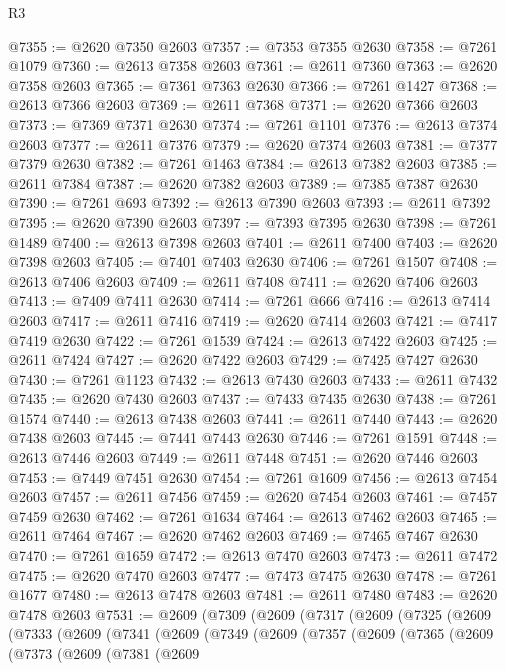 \begin{lexlean}{R3}
\begin{coremodule}
@7355 := @2620 @7350 @2603
@7357 := @7353 @7355 @2630
@7358 := @7261 @1079
@7360 := @2613 @7358 @2603
@7361 := @2611 @7360
@7363 := @2620 @7358 @2603
@7365 := @7361 @7363 @2630
@7366 := @7261 @1427
@7368 := @2613 @7366 @2603
@7369 := @2611 @7368
@7371 := @2620 @7366 @2603
@7373 := @7369 @7371 @2630
@7374 := @7261 @1101
@7376 := @2613 @7374 @2603
@7377 := @2611 @7376
@7379 := @2620 @7374 @2603
@7381 := @7377 @7379 @2630
@7382 := @7261 @1463
@7384 := @2613 @7382 @2603
@7385 := @2611 @7384
@7387 := @2620 @7382 @2603
@7389 := @7385 @7387 @2630
@7390 := @7261 @693
@7392 := @2613 @7390 @2603
@7393 := @2611 @7392
@7395 := @2620 @7390 @2603
@7397 := @7393 @7395 @2630
@7398 := @7261 @1489
@7400 := @2613 @7398 @2603
@7401 := @2611 @7400
@7403 := @2620 @7398 @2603
@7405 := @7401 @7403 @2630
@7406 := @7261 @1507
@7408 := @2613 @7406 @2603
@7409 := @2611 @7408
@7411 := @2620 @7406 @2603
@7413 := @7409 @7411 @2630
@7414 := @7261 @666
@7416 := @2613 @7414 @2603
@7417 := @2611 @7416
@7419 := @2620 @7414 @2603
@7421 := @7417 @7419 @2630
@7422 := @7261 @1539
@7424 := @2613 @7422 @2603
@7425 := @2611 @7424
@7427 := @2620 @7422 @2603
@7429 := @7425 @7427 @2630
@7430 := @7261 @1123
@7432 := @2613 @7430 @2603
@7433 := @2611 @7432
@7435 := @2620 @7430 @2603
@7437 := @7433 @7435 @2630
@7438 := @7261 @1574
@7440 := @2613 @7438 @2603
@7441 := @2611 @7440
@7443 := @2620 @7438 @2603
@7445 := @7441 @7443 @2630
@7446 := @7261 @1591
@7448 := @2613 @7446 @2603
@7449 := @2611 @7448
@7451 := @2620 @7446 @2603
@7453 := @7449 @7451 @2630
@7454 := @7261 @1609
@7456 := @2613 @7454 @2603
@7457 := @2611 @7456
@7459 := @2620 @7454 @2603
@7461 := @7457 @7459 @2630
@7462 := @7261 @1634
@7464 := @2613 @7462 @2603
@7465 := @2611 @7464
@7467 := @2620 @7462 @2603
@7469 := @7465 @7467 @2630
@7470 := @7261 @1659
@7472 := @2613 @7470 @2603
@7473 := @2611 @7472
@7475 := @2620 @7470 @2603
@7477 := @7473 @7475 @2630
@7478 := @7261 @1677
@7480 := @2613 @7478 @2603
@7481 := @2611 @7480
@7483 := @2620 @7478 @2603
@7531 := @2609
    (@7309
      (@2609
        (@7317
          (@2609
            (@7325
              (@2609
                (@7333
                  (@2609
                    (@7341
                      (@2609
                        (@7349
                          (@2609
                            (@7357
                              (@2609
                                (@7365
                                  (@2609
                                    (@7373
                                      (@2609
                                        (@7381
                                          (@2609

\end{coremodule}
\end{lexlean}
